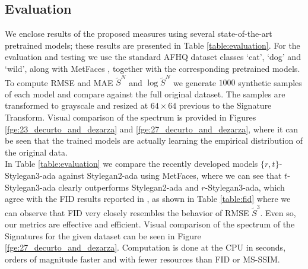 \documentclass[lettersize,journal]{IEEEtran}
\begin{document}
\subsection{Evaluation}
We enclose results of the proposed measures using several state-of-the-art pretrained models; these results are presented in Table \ref{table:evaluation}. For the evaluation and testing we use the standard AFHQ dataset \cite{Choi2020} classes `cat', `dog' and `wild', along with MetFaces \cite{Karras2020}, together with the corresponding pretrained models. To compute RMSE and MAE $\tilde{S}^{N}$ and $\log \tilde{S}^{N}$ we generate $1000$ synthetic samples of each model and compare against the full original dataset. The samples are transformed to grayscale and resized at $64\times64$ previous to the Signature Transform. Visual comparison of the spectrum is provided in Figures \ref{fge:23_decurto_and_dezarza} and \ref{fge:27_decurto_and_dezarza}, where it can be seen that the trained models are actually learning the empirical distribution of the original data.\\

In Table \ref{table:evaluation} we compare the recently developed models $\{r,t\}$-Stylegan3-ada \cite{Karras2021} against Stylegan2-ada using MetFaces, where we can see that $t$-Stylegan3-ada clearly outperforms Stylegan2-ada and $r$-Stylegan3-ada, which agree with the FID results reported in \cite{Karras2021}, as shown in Table \ref{table:fid} where we can observe that FID very closely resembles the behavior of RMSE $\tilde{S}^{3}$. Even so, our metrics are effective and efficient. Visual comparison of the spectrum of the Signatures for the given dataset can be seen in Figure \ref{fge:27_decurto_and_dezarza}. Computation is done at the CPU in seconds, orders of magnitude faster and with fewer resources than FID or MS-SSIM.
\end{document}
